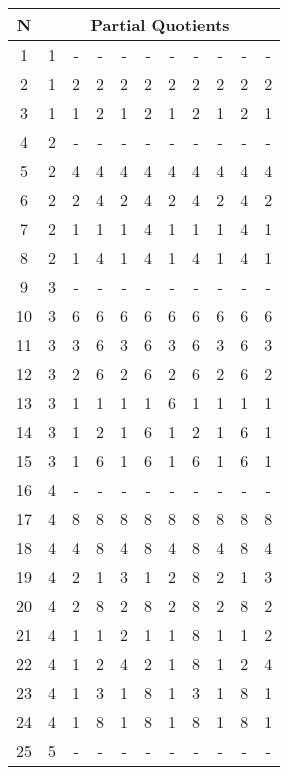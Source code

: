\documentclass{article}
\begin{document}
\begin{table}[hp]
\begin{center}
\begin{tabular}{|c|cccccccccc|}
\hline
N  & \multicolumn{10}{c|}{Partial Quotients}        \\ \hline
1  & 1 & -  & -  & -  & -  & -  & -  & -  & -  & -  \\
2  & 1 & 2  & 2  & 2  & 2  & 2  & 2  & 2  & 2  & 2  \\
3  & 1 & 1  & 2  & 1  & 2  & 1  & 2  & 1  & 2  & 1  \\
4  & 2 & -  & -  & -  & -  & -  & -  & -  & -  & -  \\
5  & 2 & 4  & 4  & 4  & 4  & 4  & 4  & 4  & 4  & 4  \\
6  & 2 & 2  & 4  & 2  & 4  & 2  & 4  & 2  & 4  & 2  \\
7  & 2 & 1  & 1  & 1  & 4  & 1  & 1  & 1  & 4  & 1  \\
8  & 2 & 1  & 4  & 1  & 4  & 1  & 4  & 1  & 4  & 1  \\
9  & 3 & -  & -  & -  & -  & -  & -  & -  & -  & -  \\
10 & 3 & 6  & 6  & 6  & 6  & 6  & 6  & 6  & 6  & 6  \\
11 & 3 & 3  & 6  & 3  & 6  & 3  & 6  & 3  & 6  & 3  \\
12 & 3 & 2  & 6  & 2  & 6  & 2  & 6  & 2  & 6  & 2  \\
13 & 3 & 1  & 1  & 1  & 1  & 6  & 1  & 1  & 1  & 1  \\
14 & 3 & 1  & 2  & 1  & 6  & 1  & 2  & 1  & 6  & 1  \\
15 & 3 & 1  & 6  & 1  & 6  & 1  & 6  & 1  & 6  & 1  \\
16 & 4 & -  & -  & -  & -  & -  & -  & -  & -  & -  \\
17 & 4 & 8  & 8  & 8  & 8  & 8  & 8  & 8  & 8  & 8  \\
18 & 4 & 4  & 8  & 4  & 8  & 4  & 8  & 4  & 8  & 4  \\
19 & 4 & 2  & 1  & 3  & 1  & 2  & 8  & 2  & 1  & 3  \\
20 & 4 & 2  & 8  & 2  & 8  & 2  & 8  & 2  & 8  & 2  \\
21 & 4 & 1  & 1  & 2  & 1  & 1  & 8  & 1  & 1  & 2  \\
22 & 4 & 1  & 2  & 4  & 2  & 1  & 8  & 1  & 2  & 4  \\
23 & 4 & 1  & 3  & 1  & 8  & 1  & 3  & 1  & 8  & 1  \\
24 & 4 & 1  & 8  & 1  & 8  & 1  & 8  & 1  & 8  & 1  \\
25 & 5 & -  & -  & -  & -  & -  & -  & -  & -  & -  \\

\end{tabular}
\end{center}
\end{table}
\end{document}
